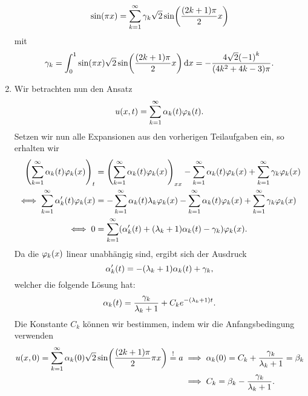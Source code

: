 \documentclass{exercise}
\begin{document}
\begin{enumerate}
        \[
            \sin\parentheses*{\pi x} = \sum_{k = 1}^\infty \gamma_k \sqrt{2}\sin\parentheses*{\frac{\parentheses*{2k + 1}\pi}{2}x}
        \]
        mit
        \[
            \gamma_k = \int_0^1 \sin\parentheses*{\pi x}\sqrt{2}\sin\parentheses*{\frac{\parentheses*{2k + 1}\pi}{2}x}\d x = -\frac{4\sqrt{2}\parentheses*{-1}^k}{\parentheses*{4k^2 + 4k - 3}\pi}.
        \]
        \item Wir betrachten nun den Ansatz
        \[
            u\parentheses*{x, t} = \sum_{k = 1}^\infty \alpha_k\parentheses*{t}\varphi_k\parentheses*{t}.
        \]
        Setzen wir nun alle Expansionen aus den vorherigen Teilaufgaben ein, so erhalten wir
        \begin{align*}
            \parentheses*{\sum_{k = 1}^\infty \alpha_k\parentheses*{t}\varphi_k\parentheses*{x}}_t &= \parentheses*{\sum_{k = 1}^\infty \alpha_k\parentheses*{t}\varphi_k\parentheses*{x}}_{xx} - \sum_{k = 1}^\infty \alpha_k\parentheses*{t}\varphi_k\parentheses*{x} + \sum_{k = 1}^{\infty}\gamma_k \varphi_k\parentheses*{x}\\
            \iff \sum_{k = 1}^\infty \alpha_k'\parentheses*{t}\varphi_k\parentheses*{x} &= -\sum_{k = 1}^\infty \alpha_k\parentheses*{t}\lambda_k \varphi_k\parentheses*{x} - \sum_{k = 1}^\infty \alpha_k\parentheses*{t}\varphi_k\parentheses*{x} + \sum_{k = 1}^\infty \gamma_k \varphi_k\parentheses*{x}\\
            \iff 0 &= \sum_{k = 1}^\infty \parentheses*{\alpha_k'\parentheses*{t} + \parentheses*{\lambda_k + 1}\alpha_k\parentheses*{t} - \gamma_k}\varphi_k\parentheses*{x}.
        \end{align*}
        Da die \(\varphi_k\parentheses*{x}\) linear unabhängig sind, ergibt sich der Ausdruck
        \[
            \alpha_k'\parentheses*{t} = -\parentheses*{\lambda_k + 1}\alpha_k\parentheses*{t} + \gamma_k,
        \]
        welcher die folgende Lösung hat:
        \[
            \alpha_k\parentheses*{t} = \frac{\gamma_k}{\lambda_k + 1} + C_k e^{-\parentheses*{\lambda_k + 1}t}.
        \]
        Die Konstante \(C_k\) können wir bestimmen, indem wir die Anfangsbedingung verwenden
        \begin{align*}
            u\parentheses*{x, 0} = \sum_{k = 1}^\infty \alpha_k\parentheses*{0}\sqrt{2}\sin\parentheses*{\frac{\parentheses*{2k + 1}\pi}{2}\pi x} \stackrel{!}{=} a &\implies \alpha_k\parentheses*{0} = C_k + \frac{\gamma_k}{\lambda_k + 1} = \beta_k\\
            &\implies C_k = \beta_k - \frac{\gamma_k}{\lambda_k + 1}.

\end{align*}
\end{enumerate}
\end{document}
